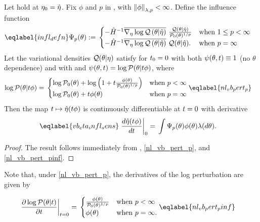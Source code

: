 
\begin{cor}
%
Let  hold at $\eta_0 = \hat\eta$.
%
Fix $\phi$ and $p$ in , with $\left\Vert\phi\right\Vert_{\lambda,p} <
\infty$.  Define the influence function
%
\begin{align}\eqlabel{infl_defn}
%
\infl_p(\theta) :={}&
\begin{cases}
    - \hessopt^{-1}
        \lqgradbar{\theta \vert \etaopt}
        \frac{\q(\theta \vert \etaopt)}{\pbase(\theta)^{1/p}}
& \textrm{when }1 \le p < \infty \\
%
    - \hessopt^{-1}
        \lqgradbar{\theta \vert \etaopt}
        \q(\theta \vert \etaopt).
& \textrm{when }p = \infty
%
\end{cases}
%
\end{align}
%
Let the variational densities $\mathcal{Q}(\theta \vert \eta)$ satisfy
 for $t_0 = 0$ with both $\psi(\theta, t) \equiv 1$ (no
$\theta$ dependence) and with and $\psi(\theta, t) = \log \mathcal{P}(\theta \vert t
\phi)$, where
%
\begin{align}
%
\logp(\theta \vert \t \phi) ={}&
\begin{cases}
    \log \pbase(\theta) +
        \log\left(1 + \t \frac{\phi(\theta)}{\pbase(\theta)^{1/p}}\right)
    & \textrm{when }p < \infty \\
    \log \pbase(\theta) + \t \phi(\theta)
    & \textrm{when }p = \infty
%
\end{cases}  \eqlabel{nl_vb_pert_p}
%
\end{align}
%
Then the map $t \mapsto \hat\eta(t \phi)$ is continuously
differentiable at $t=0$ with derivative
%
\begin{align}\eqlabel{vb_eta_infl_sens}
%
\fracat{d \etaopt(\t \phi)}{d \t}{0} ={}&
    \int \infl_p(\theta) \phi(\theta) \lambda(d\theta).
%
\end{align}
%
\begin{proof}
%
The result follows immediately from , \eqref{nl_vb_pert_p},
and \eqref{nl_vb_pert_pinf}.
%
\end{proof}
%
\end{cor}



Note that, under \eqref{nl_vb_pert_p}, the derivatives of the
log perturbation are given by

\begin{align}
%
\fracat{\partial \log \p(\theta \vert \t)}{\partial \t}{\t=0} ={}&
\begin{cases}
   \frac{\phi(\theta)}{\pbase(\theta)^{1/p}}
   & \textrm{when }p < \infty \\
   \phi(\theta)
   & \textrm{when }p = \infty.
\end{cases}\eqlabel{nl_vb_pert_pinf}
%
\end{align}

